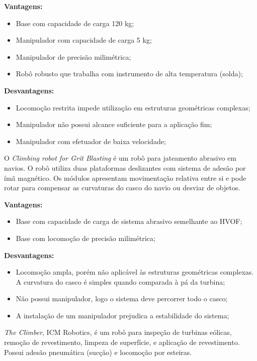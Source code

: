\textbf{Vantagens:}
\begin{itemize}
  \item Base com capacidade de carga 120 kg;
  \item Manipulador com capacidade de carga 5 kg;
  \item Manipulador de precisão milimétrica;
  \item Robô robusto que trabalha com instrumento de alta temperatura (solda);
\end{itemize}

\textbf{Desvantagens:}
\begin{itemize}
  \item Locomoção restrita impede utilização em estruturas geométricas
  complexas;
  \item Manipulador não possui alcance suficiente para a aplicação fim;
  \item Manipulador com efetuador de baixa velocidade;
\end{itemize}

O \emph{Climbing robot for Grit Blasting} é um robô para jateamento abrasivo em
navios. O robô utiliza duas plataformas deslizantes com sistema de adesão por
ímã magnético. Os módulos apresentam movimentação relativa entre si e pode rotar
para compensar as curvaturas do casco do navio ou desviar de objetos. 

\textbf{Vantagens:}
\begin{itemize}
  \item Base com capacidade de carga de sistema abrasivo semelhante ao HVOF;
  \item Base com locomoção de precisão milimétrica;
\end{itemize}

\textbf{Desvantagens:}
\begin{itemize}
  \item Locomoção ampla, porém não aplicável às estruturas geométricas
  complexas. A curvatura do casco é simples quando comparada à pá da turbina;
  \item Não possui manipulador, logo o sistema deve percorrer todo o
  casco;
  \item A instalação de um manipulador prejudica a estabilidade do sistema;
\end{itemize}

\emph{The Climber}, ICM Robotics, é um robô para inspeção de turbinas eólicas,
remoção de revestimento, limpeza de superfície, e aplicação de revestimento.
Possui adesão pneumática (sucção) e locomoção por esteiras. 

